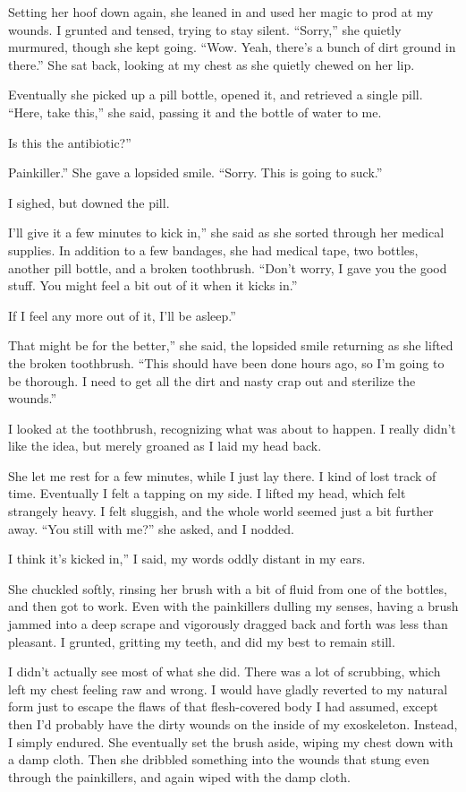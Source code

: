 Setting her hoof down again, she leaned in and used her magic to prod at my wounds. I grunted and tensed, trying to stay silent. “Sorry,” she quietly murmured, though she kept going. “Wow. Yeah, there’s a bunch of dirt ground in there.” She sat back, looking at my chest as she quietly chewed on her lip.

Eventually she picked up a pill bottle, opened it, and retrieved a single pill. “Here, take this,” she said, passing it and the bottle of water to me.

\leavevmode{}Is this the antibiotic?”

\leavevmode{}Painkiller.” She gave a lopsided smile. “Sorry. This is going to suck.”

I sighed, but downed the pill.

\leavevmode{}I’ll give it a few minutes to kick in,” she said as she sorted through her medical supplies. In addition to a few bandages, she had medical tape, two bottles, another pill bottle, and a broken toothbrush. “Don’t worry, I gave you the good stuff. You might feel a bit out of it when it kicks in.”

\leavevmode{}If I feel any more out of it, I’ll be asleep.”

\leavevmode{}That might be for the better,” she said, the lopsided smile returning as she lifted the broken toothbrush. “This should have been done hours ago, so I’m going to be thorough. I need to get all the dirt and nasty crap out and sterilize the wounds.”

I looked at the toothbrush, recognizing what was about to happen. I really didn’t like the idea, but merely groaned as I laid my head back.

She let me rest for a few minutes, while I just lay there. I kind of lost track of time. Eventually I felt a tapping on my side. I lifted my head, which felt strangely heavy. I felt sluggish, and the whole world seemed just a bit further away. “You still with me?” she asked, and I nodded.

\leavevmode{}I think it’s kicked in,” I said, my words oddly distant in my ears.

She chuckled softly, rinsing her brush with a bit of fluid from one of the bottles, and then got to work. Even with the painkillers dulling my senses, having a brush jammed into a deep scrape and vigorously dragged back and forth was less than pleasant. I grunted, gritting my teeth, and did my best to remain still.

I didn’t actually see most of what she did. There was a lot of scrubbing, which left my chest feeling raw and wrong. I would have gladly reverted to my natural form just to escape the flaws of that flesh-covered body I had assumed, except then I’d probably have the dirty wounds on the inside of my exoskeleton. Instead, I simply endured. She eventually set the brush aside, wiping my chest down with a damp cloth. Then she dribbled something into the wounds that stung even through the painkillers, and again wiped with the damp cloth.

